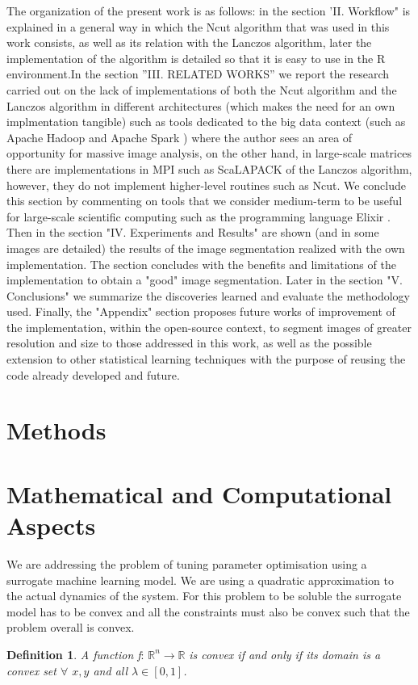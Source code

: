 \documentclass[conference]{IEEEtran}
\theoremstyle{definition}
\newtheorem{definition}{Definition}[section]
\begin{document}
The organization of the present work is as follows: in the section 'II. Workflow" is explained in a general way in which the Ncut algorithm that was used in this work consists, as well as its relation with the Lanczos algorithm, later the implementation of the algorithm is detailed so that it is easy to use in the R environment.In the section ''III. RELATED WORKS'' we report the research carried out on the lack of implementations of both the Ncut algorithm and the Lanczos algorithm in different architectures (which makes the need for an own implmentation tangible) such as tools dedicated to the big data context (such as Apache Hadoop \cite{Hadoop} and Apache Spark \cite{Spark}) where the author sees an area of opportunity for massive image analysis, on the other hand, in large-scale matrices there are implementations in MPI such as ScaLAPACK \cite{ScaLAPACK} of the Lanczos algorithm, however, they do not implement higher-level routines such as Ncut. We conclude this section by commenting on tools that we consider medium-term to be useful for large-scale scientific computing such as the programming language Elixir \cite{Elixir}. \\
Then in the section "IV. Experiments and Results" are shown (and in some images are detailed) the results of the image segmentation realized with the own implementation. The section concludes with the benefits and limitations of the implementation to obtain a "good" image segmentation. Later in the section "V. Conclusions" we summarize the discoveries learned and evaluate the methodology used. Finally, the "Appendix" section proposes future works of improvement of the implementation, within the open-source context, to segment images of greater resolution and size to those addressed in this work, as well as the possible extension to other statistical learning techniques with the purpose of reusing the code already developed and future. \\



\section{Methods}

\section{Mathematical and Computational Aspects}
We are addressing the problem of tuning parameter optimisation using a surrogate machine learning model. We are using a quadratic approximation to the actual dynamics of the system. For this problem to be soluble the surrogate model has to be convex and all the constraints must also be convex such that the problem overall is convex. \\
\theoremstyle{definition}
\begin{definition}
\textit{A function f}: $\mathbb{R}^n \rightarrow \mathbb{R}$ \textit{is convex if and only if its domain is a convex set $\forall$ $x, y$ and all $\lambda \in [0,1]$. } 
\end{definition}
\end{document}
